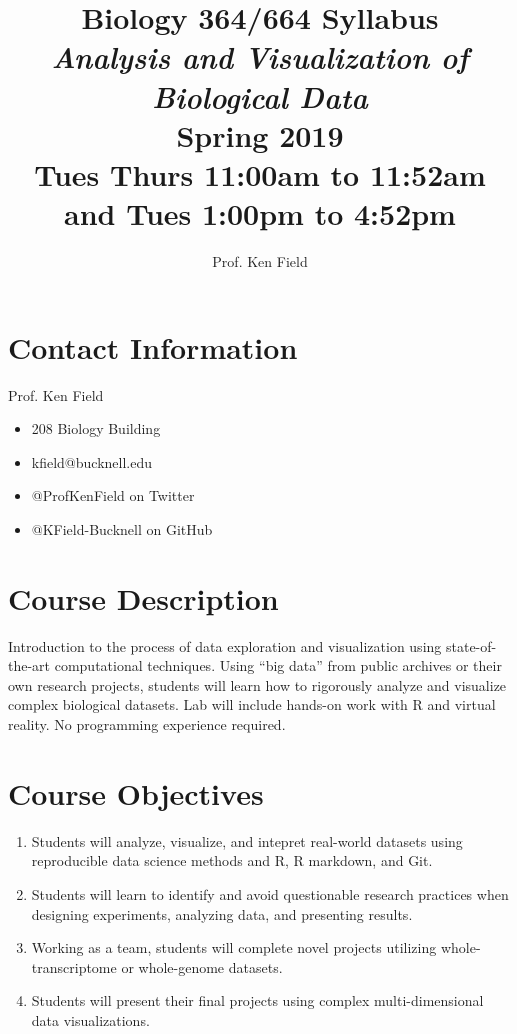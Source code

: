 \documentclass[11pt]{article} %
\title{Biology 364/664 Syllabus \\ \emph{Analysis and Visualization of Biological Data} \\ Spring 2019 	\\
Tues Thurs 11:00am to 11:52am	and Tues 1:00pm to 4:52pm}
\author{Prof. Ken Field}
\begin{document}
\maketitle



\section{Contact Information}

  Prof. Ken Field
  \begin{itemize}
  	\item 208 Biology Building
  	\item kfield@bucknell.edu
  	\item @ProfKenField on Twitter
  	\item @KField-Bucknell on GitHub
  \end{itemize}
  
  
\section{Course Description}

Introduction to the process of data exploration and visualization using
state-of-the-art computational techniques. Using ``big data'' from
public archives or their own research projects, students will learn how
to rigorously analyze and visualize complex biological datasets. Lab
will include hands-on work with R and virtual reality. No programming
experience required.
    
    
\section{Course Objectives}\label{course-objectives}

\begin{enumerate}
\def\labelenumi{\arabic{enumi}.}
\item
  Students will analyze, visualize, and intepret real-world
  datasets using reproducible data science methods and R, R markdown, and Git.
\item
  Students will learn to identify and avoid questionable research practices 
  when designing experiments, analyzing data, and presenting results.
\item
  Working as a team, students will complete novel projects utilizing
  whole-transcriptome or whole-genome datasets.
\item
  Students will present their final projects using complex
  multi-dimensional data visualizations.
\end{enumerate}
\end{document}

